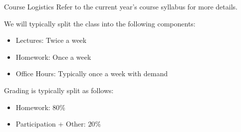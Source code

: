 \documentclass[]{beamer}
\begin{document}
\begin{frame}{Course Logistics}
    Refer to the current year's course syllabus for more details.

    \vspace{\baselineskip}

    We will typically split the class into the following components:
    \begin{itemize}
        \item Lectures: Twice a week
        \item Homework: Once a week
        \item Office Hours: Typically once a week with demand
    \end{itemize}

    \vspace{\baselineskip}

    Grading is typically split as follows:
    \begin{itemize}
        \item Homework: $80\%$
        \item Participation + Other: $20\%$
    \end{itemize}
\end{frame}
\end{document}
